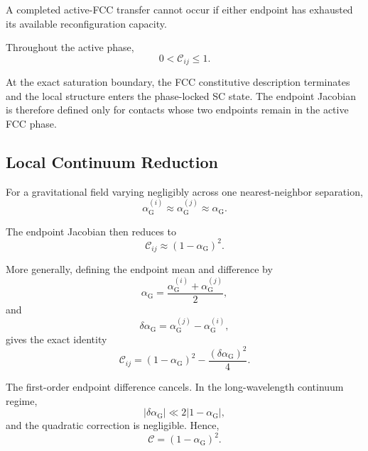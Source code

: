 A completed active-FCC transfer cannot occur if either endpoint has exhausted its available reconfiguration capacity.

Throughout the active phase,
\begin{equation}
    0 < \mathcal{C}_{ij} \leq 1.
\end{equation}

At the exact saturation boundary, the FCC constitutive description terminates and the local structure enters the phase-locked SC state. The endpoint Jacobian is therefore defined only for contacts whose two endpoints remain in the active FCC phase.

\subsection{Local Continuum Reduction}

For a gravitational field varying negligibly across one nearest-neighbor separation,
\begin{equation}
    \alpha_{\mathrm{G}}^{(i)} \approx \alpha_{\mathrm{G}}^{(j)} \approx \alpha_{\mathrm{G}}.
\end{equation}

The endpoint Jacobian then reduces to
\begin{equation}
    \boxed{ \mathcal{C}_{ij} \approx \left( 1-\alpha_{\mathrm{G}} \right)^2 }.
\end{equation}

More generally, defining the endpoint mean and difference by
\begin{equation}
    \alpha_{\mathrm{G}} = \frac{ \alpha_{\mathrm{G}}^{(i)} + \alpha_{\mathrm{G}}^{(j)} }{2},
\end{equation}
and
\begin{equation}
    \delta\alpha_{\mathrm{G}} = \alpha_{\mathrm{G}}^{(j)} - \alpha_{\mathrm{G}}^{(i)},
\end{equation}
gives the exact identity
\begin{equation}
    \mathcal{C}_{ij} = \left( 1-\alpha_{\mathrm{G}} \right)^2 - \frac{ \left( \delta\alpha_{\mathrm{G}} \right)^2 }{4}.
\end{equation}

The first-order endpoint difference cancels. In the long-wavelength continuum regime,
\begin{equation}
    \left| \delta\alpha_{\mathrm{G}} \right| \ll 2 \left| 1-\alpha_{\mathrm{G}} \right|,
\end{equation}
and the quadratic correction is negligible. Hence,
\begin{equation}
    \boxed{ \mathcal{C} = \left( 1-\alpha_{\mathrm{G}} \right)^2 }.
\end{equation}

